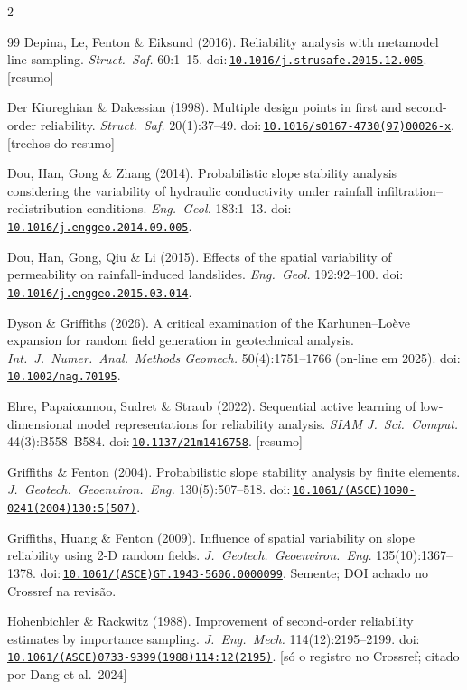 \documentclass[11pt,a4paper]{article}
\newcommand{\doi}[1]{doi:\,\href{https://doi.org/#1}{\nolinkurl{#1}}}
\begin{document}
\begin{multicols}{2}
\begin{thebibliography}{99}
 Depina, Le, Fenton \& Eiksund (2016). Reliability analysis with metamodel line
sampling. \emph{Struct.\ Saf.} 60:1--15. \doi{10.1016/j.strusafe.2015.12.005}. [resumo]

 Der Kiureghian \& Dakessian (1998). Multiple design
points in first and second-order reliability. \emph{Struct.\ Saf.} 20(1):37--49.
\doi{10.1016/s0167-4730(97)00026-x}. [trechos do resumo]

 Dou, Han, Gong \& Zhang (2014). Probabilistic slope stability analysis considering
the variability of hydraulic conductivity under rainfall infiltration--redistribution conditions. \emph{Eng.\ Geol.}
183:1--13. \doi{10.1016/j.enggeo.2014.09.005}.

 Dou, Han, Gong, Qiu \& Li (2015). Effects of the spatial variability of
permeability on rainfall-induced landslides. \emph{Eng.\ Geol.} 192:92--100. \doi{10.1016/j.enggeo.2015.03.014}.

 Dyson \& Griffiths (2026). A critical examination of the Karhunen--Loève
expansion for random field generation in geotechnical analysis. \emph{Int.\ J.\ Numer.\ Anal.\ Methods Geomech.}
50(4):1751--1766 (on-line em 2025). \doi{10.1002/nag.70195}.

 Ehre, Papaioannou, Sudret \& Straub (2022). Sequential active learning of
low-dimensional model representations for reliability analysis. \emph{SIAM J.\ Sci.\ Comput.} 44(3):B558--B584.
\doi{10.1137/21m1416758}. [resumo]

 Griffiths \& Fenton (2004). Probabilistic slope stability analysis by
finite elements. \emph{J.\ Geotech.\ Geoenviron.\ Eng.} 130(5):507--518. \doi{10.1061/(ASCE)1090-0241(2004)130:5(507)}.

 Griffiths, Huang \& Fenton (2009). Influence of spatial variability on
slope reliability using 2-D random fields. \emph{J.\ Geotech.\ Geoenviron.\ Eng.} 135(10):1367--1378.
\doi{10.1061/(ASCE)GT.1943-5606.0000099}. Semente; DOI achado no Crossref na revisão.

 Hohenbichler \& Rackwitz (1988). Improvement of second-order
reliability estimates by importance sampling. \emph{J.\ Eng.\ Mech.} 114(12):2195--2199.
\doi{10.1061/(ASCE)0733-9399(1988)114:12(2195)}. [só o registro no Crossref; citado por Dang et al.\ 2024]


\end{thebibliography}
\end{multicols}
\end{document}
